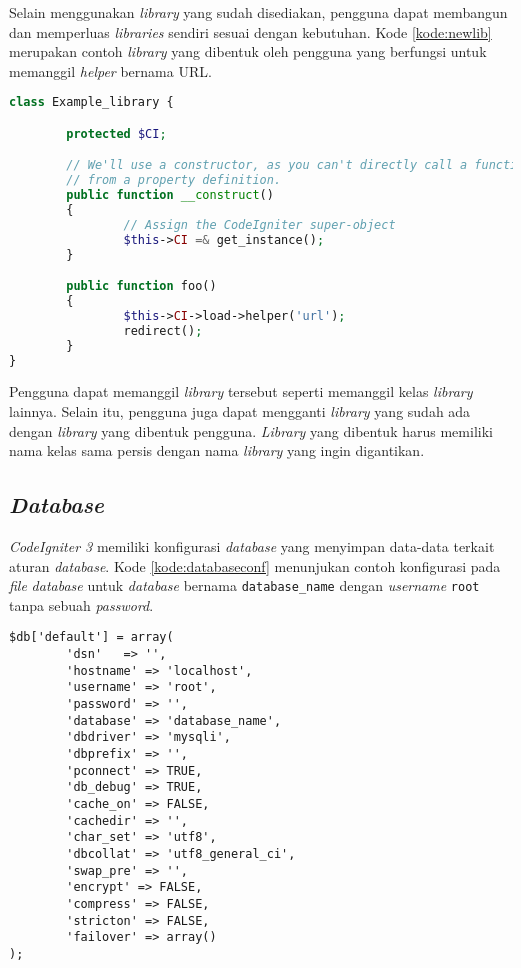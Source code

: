 Selain menggunakan \textit{library} yang sudah disediakan, pengguna dapat membangun dan memperluas \textit{libraries} sendiri sesuai dengan kebutuhan. Kode \ref{kode:newlib} merupakan contoh \textit{library} yang dibentuk oleh pengguna yang berfungsi untuk memanggil \textit{helper} bernama URL.

\begin{lstlisting}[language=PHP, caption=Contoh \textit{library} yang dibentuk, label=kode:newlib]
class Example_library {

        protected $CI;

        // We'll use a constructor, as you can't directly call a function
        // from a property definition.
        public function __construct()
        {
                // Assign the CodeIgniter super-object
                $this->CI =& get_instance();
        }

        public function foo()
        {
                $this->CI->load->helper('url');
                redirect();
        }
}
\end{lstlisting}

Pengguna dapat memanggil \textit{library} tersebut seperti memanggil kelas \textit{library} lainnya. Selain itu, pengguna juga dapat mengganti \textit{library} yang sudah ada dengan \textit{library} yang dibentuk pengguna. \textit{Library} yang dibentuk harus memiliki nama kelas sama persis dengan nama \textit{library} yang ingin digantikan.

\subsection{\textit{Database}}
\textit{CodeIgniter 3} memiliki konfigurasi \textit{database} yang menyimpan data-data terkait aturan \textit{database}. Kode \ref{kode:databaseconf} menunjukan contoh konfigurasi pada \textit{file} \textit{database} untuk \textit{database} bernama \texttt{database\_name} dengan \textit{username} \texttt{root} tanpa sebuah \textit{password}.

\begin{lstlisting}[caption=Contoh konfigurasi \textit{database}, label=kode:databaseconf]
$db['default'] = array(
        'dsn'   => '',
        'hostname' => 'localhost',
        'username' => 'root',
        'password' => '',
        'database' => 'database_name',
        'dbdriver' => 'mysqli',
        'dbprefix' => '',
        'pconnect' => TRUE,
        'db_debug' => TRUE,
        'cache_on' => FALSE,
        'cachedir' => '',
        'char_set' => 'utf8',
        'dbcollat' => 'utf8_general_ci',
        'swap_pre' => '',
        'encrypt' => FALSE,
        'compress' => FALSE,
        'stricton' => FALSE,
        'failover' => array()
);
\end{lstlisting}

